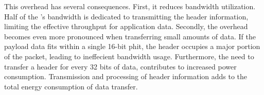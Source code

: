 This overhead has several consequences.
First, it reduces bandwidth utilization.
Half of the \confignoc{}'s bandwidth is dedicated to transmitting the header information, limiting the effective throughput for application data.
Secondly, the overhead becomes even more pronounced when transferring small amounts of data.
If the payload data fits within a single 16-bit phit, the header occupies a major portion of the packet, leading to ineffecient bandwidth usage.
Furthermore, the need to transfer a header for every 32 bits of data, contributes to increased power consumption.
Transmission and processing of header information adds to the total energy consumption of data transfer.
